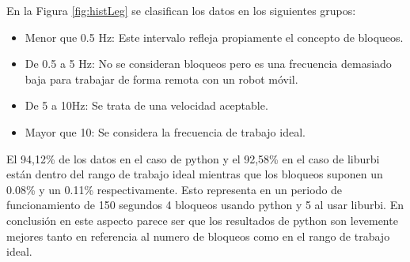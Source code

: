 \documentclass[12pt,a4paper,final,twoside]{book}
\begin{document}
En la Figura \ref{fig:histLeg} se clasifican los datos en los siguientes grupos: 
\begin{itemize}
\item Menor que 0.5 Hz: Este intervalo refleja propiamente el concepto de bloqueos.
\item De 0.5 a 5 Hz: No se consideran bloqueos pero es una frecuencia demasiado baja para trabajar de forma remota con un robot móvil.
\item De 5 a 10Hz: Se trata de una velocidad aceptable.
\item Mayor que 10: Se considera la frecuencia de trabajo ideal.
\end{itemize}

El 94,12\% de los datos en el caso de python y el 92,58\% en el caso de liburbi están dentro del rango de trabajo ideal mientras que los bloqueos suponen un 0.08\% y un 0.11\% respectivamente. 
Esto representa en un periodo de funcionamiento de 150 segundos 4 bloqueos usando python y 5 al usar liburbi.
En conclusión en este aspecto parece ser que los resultados de python son levemente mejores tanto en referencia al numero de bloqueos como en el rango de trabajo ideal. 
\end{document}
